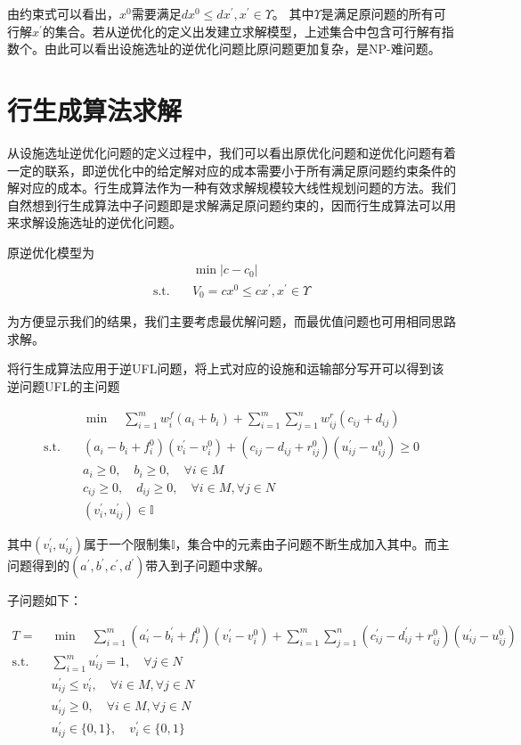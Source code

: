 \documentclass[UTF8]{article}
\begin{document}
由约束式可以看出，$x^0$需要满足$dx^0 \leq dx^{'}, x^{'} \in \Upsilon$。 其中$\Upsilon$是满足原问题的所有可行解$x^{'}$的集合。若从逆优化的定义出发建立求解模型，上述集合中包含可行解有指数个。由此可以看出设施选址的逆优化问题比原问题更加复杂，是NP-难问题。

\section{行生成算法求解}
从设施选址逆优化问题的定义过程中，我们可以看出原优化问题和逆优化问题有着一定的联系，即逆优化中的给定解对应的成本需要小于所有满足原问题约束条件的解对应的成本。行生成算法作为一种有效求解规模较大线性规划问题的方法。我们自然想到行生成算法中子问题即是求解满足原问题约束的，因而行生成算法可以用来求解设施选址的逆优化问题。

原逆优化模型为
\begin{align*}
&\min |c-c_0|  \\
\text{s.t.}\quad & V_0 = cx^0 \leq cx^{'}, x^{'} \in \Upsilon
\end{align*}

为方便显示我们的结果，我们主要考虑最优解问题，而最优值问题也可用相同思路求解。

将行生成算法应用于逆UFL问题，将上式对应的设施和运输部分写开可以得到该逆问题UFL的主问题

\begin{align*}
&\min \quad \sum_{i=1}^m w_i^f(a_i+b_i)+\sum_{i=1}^m\sum_{j=1}^n w_{ij}^r(c_{ij}+d_{ij})\\
\text{s.t.}\quad & (a_i-b_i+f_i^0)(v_i^{'}-v_i^{0}) + (c_{ij}-d_{ij}+r_{ij}^0)(u_{ij}^{'}-u_{ij}^{0})  \geq 0 \\
& a_i \geq 0 ,\quad b_i \geq 0,\quad \forall i \in M \\
& c_{ij} \geq 0, \quad d_{ij} \geq 0, \quad \forall i \in M, \forall j \in N\\
& (v_i^{'},u_{ij}^{'}) \in \mathbb{I}
\end{align*}

其中$(v_i^{'},u_{ij}^{'})$属于一个限制集$\mathbb{I}$，集合中的元素由子问题不断生成加入其中。而主问题得到的$(a^{'},b^{'},c^{'},d^{'})$带入到子问题中求解。

子问题如下：

\begin{align*}
T = &\min \quad \sum_{i=1}^m(a_i^{'}-b_i^{'}+f_i^0)(v_i^{'}-v_i^{0})+\sum_{i=1}^m\sum_{j=1}^n(c_{ij}^{'}-d_{ij}^{'}+r_{ij}^0)(u_{ij}^{'}-u_{ij}^{0}) \\
\text{s.t.}\quad & \sum_{i=1}^m u_{ij}^{'} =1, \quad \forall j\in N \\
& u_{ij}^{'} \leq v_{i}^{'}, \quad \forall i \in M, \forall j \in N \\
& u_{ij}^{'} \geq 0, \quad \forall i \in M, \forall j \in N \\
&u_{ij}^{'} \in \{0,1\} ,\quad v_{i}^{'} \in \{0,1\}
\end{align*}
\end{document}

